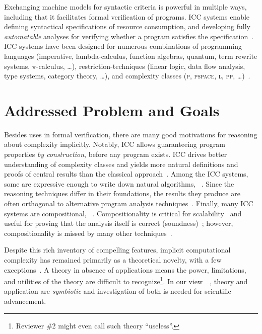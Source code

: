 Exchanging machine models for syntactic criteria is powerful in multiple ways, including that it facilitates formal verification of programs.
ICC systems enable defining syntactical specifications of resource consumption, and developing fully \emph{automatable} analyses for verifying whether a program satisfies the specification~\cite{heraud2011}.
ICC systems have been designed for numerous combinations of programming languages (imperative,  lambda-calculus, function algebras, quantum, term rewrite systems, \(\pi\)-calculus, \ldots), restriction-techniques (linear logic, data flow analysis, type systems, category theory, \ldots), and complexity classes (\textsc{p}, \textsc{pspace}, \textsc{l}, \textsc{pp}, \ldots)~\cite{baillot2012,moyen2017,pchoux2020}.


\section{Addressed Problem and Goals}
\label{sec:goals}

Besides uses in formal verification, there are many good motivations for reasoning about complexity implicitly.
Notably, ICC allows guaranteeing program properties \emph{by construction}, before any program exists.
ICC drives better understanding of complexity classes and yields more natural definitions and proofs of central results than the classical approach~\cite{kristiansen2017}.
Among the ICC systems, some are expressive enough to write down {natural} algorithms, \eg~\cite{jones2009,marion2011}.
Since the reasoning techniques differ in their foundations, the results they produce are often orthogonal to alternative program analysis techniques~\cite{aubert20222}.
Finally, many ICC systems are {compositional}, \eg~\cite{jones2009,marion2011,hainry2023,atkey2024}.
Compositionality is critical for scalability~\cite{carbonneaux2015} and useful for proving that the analysis itself is correct (\ie soundness)~\cite{keidel2021};
however, compositionality is missed by many other techniques~\cite{carbonneaux2015,schiebel2024}.

Despite this rich inventory of compelling features, implicit computational complexity has remained primarily as a theoretical novelty, with a few exceptions~\cite{avanzini2017,avanzini2008,moyen20172,hoffmann2012,hainry2021,feree2018}.
A theory in absence of applications means the power, limitations, and utilities of the theory are difficult to recognize\footnote{
Reviewer \#2 might even call such theory \enquote{useless}.}.
In our view~\cite[pg. xxxv]{bishop2003}~\cite[p. 75]{moyen2017}, theory and application are \emph{symbiotic} and investigation of both is needed for scientific advancement.

